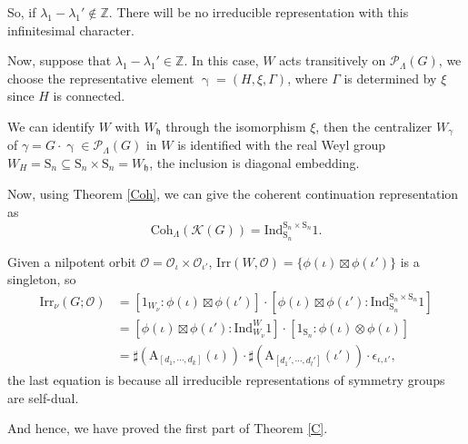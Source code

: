 \documentclass[12pt, a4paper]{amsart}
\numberwithin{equation}{section}
\newcommand{\BZ}{{\mathbb {Z}}}
\newcommand{\CK}{{\mathcal {K}}}
\newcommand{\CO}{{\mathcal {O}}}
\newcommand{\CP}{{\mathcal {P}}}
\newcommand{\fh}{\mathfrak{h}}
\newcommand{\A}{{\mathrm{A}}}
\newcommand{\Ind}{{\mathrm{Ind}}}
\newcommand{\Irr}{{\mathrm{Irr}}}
\begin{document}
So, if $\lambda_1 - \lambda_1' \notin \BZ$. There will be no irreducible representation with this infinitesimal character.  

Now, suppose that $\lambda_1 - \lambda_1' \in \BZ$. In this case, $W$ acts transitively on $\CP_{\Lambda}(G)$, we choose the representative element $\upgamma = (H,\xi, \Gamma)$, where $\Gamma$ is determined by $\xi$ since $H$ is connected.

We can identify $W$ with $W_\fh$ through the isomorphism $\xi$, then the centralizer $W_{{\gamma}}$ of ${\gamma} = G \cdot \upgamma \in \CP_{\Lambda}(G)$ in $W$ is identified with the real Weyl group $W_{H} = \mathrm{S}_n \subseteq \mathrm{S}_n \times \mathrm{S}_n = W_{\fh}$, the inclusion is diagonal embedding.

Now, using Theorem \ref{Coh}, we can give the coherent continuation representation as 
\begin{equation}
    \mathrm{Coh}_{\Lambda}(\CK(G)) = \Ind^{\mathrm{S}_n \times \mathrm{S}_n}_{\mathrm{S}_n}1.
\end{equation}

Given a nilpotent orbit $\CO = \CO_{\iota} \times \CO_{\iota'}$, $\Irr(W,\CO) = \{\phi(\iota) \boxtimes \phi(\iota')\}$ is a singleton, so
\begin{align}
    \Irr_{\nu}(G;\CO) & = [1_{W_\nu}:\phi(\iota) \boxtimes \phi(\iota')]\cdot[\phi(\iota)\boxtimes \phi(\iota'):\Ind^{\mathrm{S}_n \times \mathrm{S}_n}_{\mathrm{S}_n}1]\\
    & = [\phi(\iota)\boxtimes \phi(\iota'):\Ind_{W_\nu}^{W}1] \cdot [1_{\mathrm{S}_n}:\phi(\iota) \otimes \phi(\iota)]\\
    & = \sharp(\A_{[d_1,\cdots,d_k]}(\iota)) \cdot \sharp(\A_{[d_1',\cdots,d_l']}(\iota')) \cdot \epsilon_{\iota,\iota'},
\end{align}
the last equation is because all irreducible representations of symmetry groups are self-dual.

And hence, we have proved the first part of Theorem \ref{C}.
\end{document}
